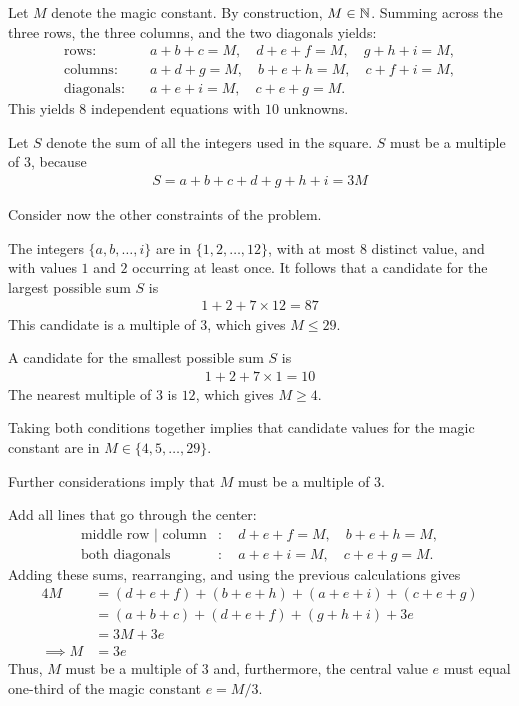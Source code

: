 Let $M$ denote the magic constant. By construction, $M\in\mathbb{N}$. Summing across the three rows, the three columns, and the two diagonals yields:
\begin{align*}
\text{rows}:\quad &
a + b + c = M, 
\quad
d + e + f = M,
\quad
g + h + i = M,
\\
\text{columns}:\quad &
a + d + g = M,
\quad
b + e + h = M,
\quad
c + f + i = M,
\\
\text{diagonals}:\quad &
a + e + i = M,
\quad
c + e + g = M.
\end{align*}
This yields $8$ independent equations with $10$ unknowns. 

Let $S$ denote the sum of all the integers used in the square. $S$ must be a multiple of $3$, because
\begin{align*}
S = a + b + c + d + g + h + i = 3 M
\end{align*}

Consider now the other constraints of the problem. 

The integers $\{a,b,\ldots,i\}$ are in $\{1,2,\ldots,12\}$, with at most $8$ distinct value, and with values $1$ and $2$ occurring at least once. It follows that a candidate for the largest possible sum $S$ is
\begin{align*}
1 + 2 + 7 \times 12
= 87
\end{align*}
This candidate is a multiple of $3$, which gives $M\le29$. 

A candidate for the smallest possible sum $S$ is
\begin{align*}
1 + 2 + 7 \times 1
= 10
\end{align*}
The nearest multiple of $3$ is $12$, which gives $M\ge4$. 

Taking both conditions together implies that candidate values for the magic constant are in $M\in\{4,5,\ldots,29\}$. 

Further considerations imply that $M$ must be a multiple of $3$.

Add all lines that go through the center:
\begin{align*}
\text{middle row | column}& :\quad
d + e + f = M,
\quad
b + e + h = M,
\\
\text{both diagonals}& :\quad
a + e + i = M,
\quad
c + e + g = M.
\end{align*}
Adding these sums, rearranging, and using the previous calculations gives
\begin{align*}
4M& = (d + e + f) + (b + e + h) + (a + e + i) + (c + e + g)
\\
  & = (a + b + c) + (d + e + f) + (g + h + i) + 3e
\\
  & = 3M + 3e
\\
\implies
M & = 3e
\end{align*}
Thus, $M$ must be a multiple of $3$ and, furthermore, the central value $e$ must equal one-third of the magic constant $e=M/3$. 


